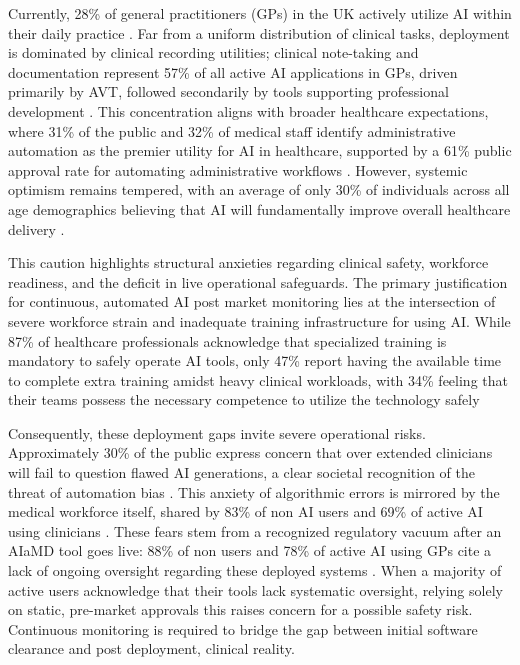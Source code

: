\documentclass[11pt,a4paper]{article}
\begin{document}
Currently, 28\% of general practitioners (GPs) in the UK actively utilize AI within their daily practice \cite{vention2026UKhealthcare} . Far from a uniform distribution of clinical tasks, deployment is dominated by clinical recording utilities; clinical note-taking and documentation represent 57\% of all active AI applications in GPs, driven primarily by AVT, followed secondarily by tools supporting professional development \cite{vention2026UKhealthcare} . This concentration aligns with broader healthcare expectations, where 31\% of the public and 32\% of medical staff identify administrative automation as the premier utility for AI in healthcare, supported by a 61\% public approval rate for automating administrative workflows \cite{vention2026UKhealthcare} . However, systemic optimism remains tempered, with an average of only 30\% of individuals across all age demographics believing that AI will fundamentally improve overall healthcare delivery \cite{vention2026UKhealthcare}  .

This caution highlights structural anxieties regarding clinical safety, workforce readiness, and the deficit in live operational safeguards. The primary justification for continuous, automated AI post market monitoring lies at the intersection of severe workforce strain and inadequate training infrastructure for using AI. While 87\% of healthcare professionals acknowledge that specialized training is mandatory to safely operate AI tools, only 47\% report having the available time to complete extra training amidst heavy clinical workloads, with 34\% feeling that their teams possess the necessary competence to utilize the technology safely \cite{vention2026UKhealthcare}

Consequently, these deployment gaps invite severe operational risks. Approximately 30\% of the public express concern that over extended clinicians will fail to question flawed AI generations, a clear societal recognition of the threat of automation bias \cite{vention2026UKhealthcare} . This anxiety of algorithmic errors is mirrored by the medical workforce itself, shared by 83\% of non AI users and 69\% of active AI using clinicians \cite{vention2026UKhealthcare} . These fears stem from a recognized regulatory vacuum after an AIaMD tool goes live: 88\% of non users and 78\% of active AI using GPs cite a lack of ongoing oversight regarding these deployed systems \cite{vention2026UKhealthcare} . When a majority of active users acknowledge that their tools lack systematic oversight, relying solely on static, pre-market approvals this raises concern for a possible safety risk. Continuous monitoring is required to bridge the gap between initial software clearance and post deployment, clinical reality. 
\end{document}
